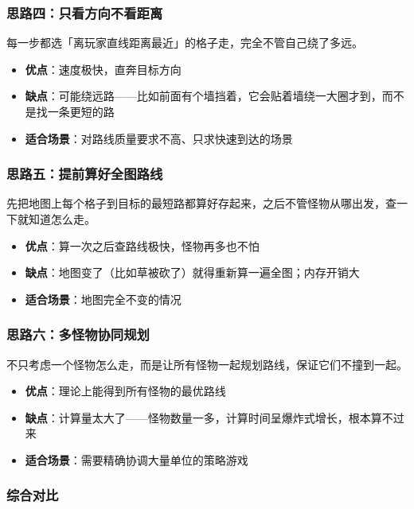 \documentclass[12pt,a4paper]{article}
\begin{document}
\subsubsection{思路四：只看方向不看距离}

每一步都选「离玩家直线距离最近」的格子走，完全不管自己绕了多远。

\begin{itemize}[leftmargin=2em]
    \item \textbf{优点}：速度极快，直奔目标方向
    \item \textbf{缺点}：可能绕远路——比如前面有个墙挡着，它会贴着墙绕一大圈才到，而不是找一条更短的路
    \item \textbf{适合场景}：对路线质量要求不高、只求快速到达的场景
\end{itemize}

\subsubsection{思路五：提前算好全图路线}

先把地图上每个格子到目标的最短路都算好存起来，之后不管怪物从哪出发，查一下就知道怎么走。

\begin{itemize}[leftmargin=2em]
    \item \textbf{优点}：算一次之后查路线极快，怪物再多也不怕
    \item \textbf{缺点}：地图变了（比如草被砍了）就得重新算一遍全图；内存开销大
    \item \textbf{适合场景}：地图完全不变的情况
\end{itemize}

\subsubsection{思路六：多怪物协同规划}

不只考虑一个怪物怎么走，而是让所有怪物一起规划路线，保证它们不撞到一起。

\begin{itemize}[leftmargin=2em]
    \item \textbf{优点}：理论上能得到所有怪物的最优路线
    \item \textbf{缺点}：计算量太大了——怪物数量一多，计算时间呈爆炸式增长，根本算不过来
    \item \textbf{适合场景}：需要精确协调大量单位的策略游戏
\end{itemize}

\subsubsection{综合对比}
\end{document}
